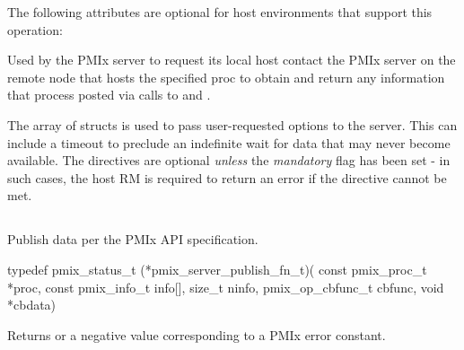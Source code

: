 \optattrstart
The following attributes are optional for host environments that support this operation:


\optattrend

\descr

Used by the \ac{PMIx} server to request its local host contact the \ac{PMIx} server on the remote node that hosts the specified proc to obtain and return any information that process posted via calls to  and .

The array of  structs is used to pass user-requested options to the server.
This can include a timeout to preclude an indefinite wait for data that may never become available.
The directives are optional \emph{unless} the \emph{mandatory} flag has been set - in such cases, the host \ac{RM} is required to return an error if the directive cannot be met.


\subsection{}

\summary

Publish data per the PMIx API specification.

\format

\cspecificstart
\begin{codepar}
typedef pmix_status_t (*pmix_server_publish_fn_t)(
                             const pmix_proc_t *proc,
                             const pmix_info_t info[],
                             size_t ninfo,
                             pmix_op_cbfunc_t cbfunc,
                             void *cbdata)
\end{codepar}
\cspecificend

\begin{arglist}
\end{arglist}

Returns  or a negative value corresponding to a PMIx error constant.

